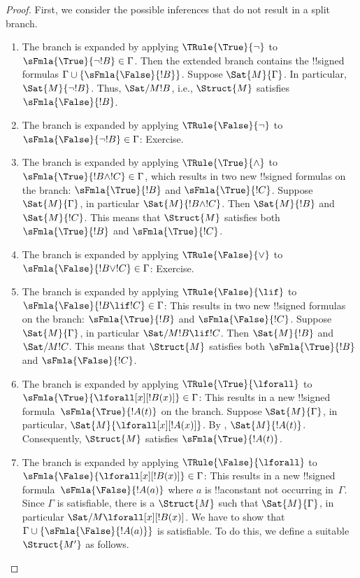 \begin{proof}
First, we consider the possible inferences that do not result in a split branch.
\begin{enumerate}
\item The branch is expanded by applying $\TRule{\True}{\lnot}$ to
  $\sFmla{\True}{\lnot !B} \in \Gamma$. Then the extended branch
  contains the !!{signed formula}s $\Gamma \cup
  \{\sFmla{\False}{!B}\}$.  Suppose
  $\Sat{M}{\Gamma}$. In particular,
  $\Sat{M}{\lnot !B}$. Thus,
  $\Sat/{M}{!B}$, i.e.,
  $\Struct{M}$ satisfies
  $\sFmla{\False}{!B}$.
\item The branch is expanded by applying $\TRule{\False}{\lnot}$ to
  $\sFmla{\False}{\lnot !B} \in \Gamma$: Exercise.
\item The branch is expanded by applying $\TRule{\True}{\land}$ to
  $\sFmla{\True}{!B \land !C} \in \Gamma$, which results in two new
  !!{signed formula}s on the branch: $\sFmla{\True}{!B}$ and
  $\sFmla{\True}{!C}$. Suppose
  $\Sat{M}{\Gamma}$, in particular
  $\Sat{M}{!B \land !C}$. Then
  $\Sat{M}{!B}$ and
  $\Sat{M}{!C}$. This means that
  $\Struct{M}$ satisfies both
  $\sFmla{\True}{!B}$ and $\sFmla{\True}{!C}$.
\item The branch is expanded by applying $\TRule{\False}{\lor}$ to
  $\sFmla{\False}{!B \lor !C} \in \Gamma$: Exercise.
\item The branch is expanded by applying $\TRule{\False}{\lif}$ to
  $\sFmla{\False}{!B \lif !C} \in \Gamma$: This results in two new
  !!{signed formula}s on the branch: $\sFmla{\True}{!B}$ and
  $\sFmla{\False}{!C}$. Suppose
  $\Sat{M}{\Gamma}$, in particular
  $\Sat/{M}{!B \lif !C}$. Then
  $\Sat{M}{!B}$ and
  $\Sat/{M}{!C}$. This means that
  $\Struct{M}$ satisfies both
  $\sFmla{\True}{!B}$ and $\sFmla{\False}{!C}$.


\item The branch is expanded by applying $\TRule{\True}{\lforall}$ to
  $\sFmla{\True}{\lforall[x][!B(x)]} \in \Gamma$: This results in a
  new !!{signed formula}~$\sFmla{\True}{!A(t)}$ on the branch.
  Suppose $\Sat{M}{\Gamma}$, in particular,
  $\Sat{M}{\lforall[x][!A(x)]}$.  By
  , $\Sat{M}{!A(t)}$.  Consequently,
  $\Struct{M}$ satisfies $\sFmla{\True}{!A(t)}$.

\item The branch is expanded by applying $\TRule{\False}{\lforall}$ to
  $\sFmla{\False}{\lforall[x][!B(x)]} \in \Gamma$: This results in a
  new !!{signed formula}~$\sFmla{\False}{!A(a)}$ where $a$ is
  !!a{constant} not occurring in~$\Gamma$. Since $\Gamma$ is
  satisfiable, there is a $\Struct{M}$ such that $\Sat{M}{\Gamma}$, in
  particular $\Sat/{M}{\lforall[x][!B(x)]}$. We have to show that
  $\Gamma \cup \{\sFmla{\False}{!A(a)}\}$ is satisfiable. To do this,
  we define a suitable~$\Struct{M'}$ as follows.


\end{enumerate}
\end{proof}
